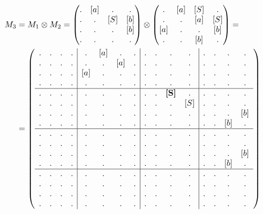 \begin{example}
\begin{align}
M_3 &= M_1 \otimes M_2 = 
\begin{pmatrix} 
. & [a] & . & . \\
. & . & [S] & [b] \\
. & . & . & [b] \\
. & . & . & . 
\end{pmatrix}
\otimes 
\begin{pmatrix} 
. & [a] & [S] & . \\
. & . & [a] & [S] \\
[a] & . & . & [b] \\
. & . & [b] & . 
\end{pmatrix}
=\notag\\
&=
\left(\begin{array}{c c c c | c c c c | c c c c | c c c c } 
. & . & . & .  &  . & [a] & . & .  &  . & . & . & .    &  . & . & . & .   \\
. & . & . & .  &  . & . & [a] & .  &  . & . & . & .    &  . & . & . & .   \\
. & . & . & .  &  [a] & . & . & .  &  . & . & . & .    &  . & . & . & .   \\
. & . & . & .  &  . & . & . & .    &  . & . & . & .    &  . & . & . & .   \\
\hline
. & . & . & .  &  . & . & . & .    &  . & . & \textbf{[S]} & .    &  . & . & . & .   \\
. & . & . & .  &  . & . & . & .    &  . & . & .   & [S]  &  . & . & . & .   \\
. & . & . & .  &  . & . & . & .    &  . & . & .   & .    &  . & . & . & [b] \\
. & . & . & .  &  . & . & . & .    &  . & . & .   & .    &  . & . & [b] & . \\
\hline
. & . & . & .  &  . & . & . & .    &  . & . & . & .    &  . & . & . & .   \\
. & . & . & .  &  . & . & . & .    &  . & . & . & .    &  . & . & . & .   \\
. & . & . & .  &  . & . & . & .    &  . & . & . & .    &  . & . & . & [b] \\
. & . & . & .  &  . & . & . & .    &  . & . & . & .    &  . & . & [b] & . \\
\hline
. & . & . & .  &  . & . & . & .    &  . & . & . & .    &  . & . & . & .   \\
. & . & . & .  &  . & . & . & .    &  . & . & . & .    &  . & . & . & .   \\
. & . & . & .  &  . & . & . & .    &  . & . & . & .    &  . & . & . & .   \\
. & . & . & .  &  . & . & . & .    &  . & . & . & .    &  . & . & . & . 
\end{array}\right)
\label{eq:graph_tm}
\end{align}


\end{example}
